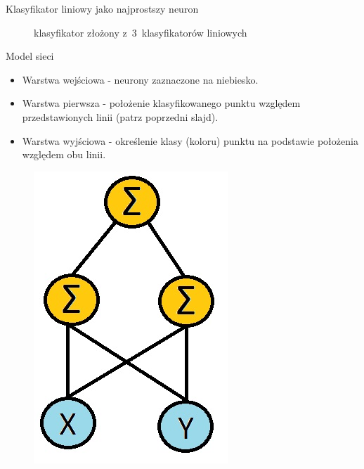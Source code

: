 \documentclass[xcolor=dvipsnames]{beamer}
\begin{document}
\begin{frame}{Klasyfikator liniowy jako najprostszy neuron}
\begin{minipage}[t]{0.45\linewidth}
\begin{figure}
			\caption{klasyfikator złożony z~3~klasyfikatorów liniowych}
		\end{figure}
	\end{minipage}
\end{frame}
\begin{frame}{Model sieci}
	\begin{minipage}[t]{0.6\linewidth}
		\vfill
		\begin{itemize}
			\item Warstwa wejściowa - neurony zaznaczone na niebiesko.
			\item Warstwa pierwsza - położenie klasyfikowanego punktu względem przedstawionych linii (patrz poprzedni slajd).
			\item Warstwa wyjściowa - określenie klasy (koloru) punktu na podstawie położenia względem obu linii.
		\end{itemize}	
	\end{minipage}%
	\hfill
	\begin{minipage}[t]{0.3\linewidth}
		\vfill
		\begin{figure}
			\includegraphics[height=0.6\textheight]{img/model_sieci.jpg}
		\end{figure}
	\end{minipage}
\end{frame}
\end{document}
